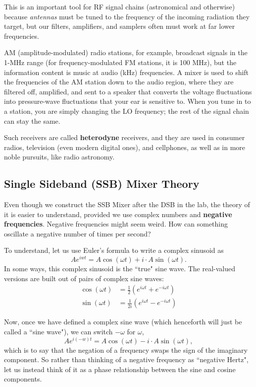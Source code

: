 \documentclass[11pt,preprint]{aastex}
\begin{document}
This is an important tool for RF signal chains (astronomical and otherwise)
because {\it antennas} must be tuned to the frequency of the incoming radiation they
target, but our filters, amplifiers, and samplers often must work at far lower
frequencies.

AM (amplitude-modulated) radio stations, for example, broadcast signals in the 1-MHz
range (for frequency-modulated FM stations, it is 100 MHz), but the information content
is music at audio (kHz) frequencies.
A mixer is used to shift the frequencies of
the AM station down to the audio region, where they are filtered off, amplified, and
sent to a speaker that converts the voltage fluctuations into pressure-wave fluctuations
that your ear is sensitive to.  When you tune in to a station, you are simply changing
the LO frequency; the rest of the signal chain can stay the same.

Such receivers are called {\bf heterodyne} receivers, and they are used 
in consumer radios, television (even modern digital ones), and cellphones, as well
as in more noble pursuits, like radio astronomy.
%
\subsection{Single Sideband (SSB) Mixer Theory}

\noindent
Even though we construct the SSB Mixer after the DSB in the lab, the theory of it
is easier to understand, provided we use
complex numbers and {\bf negative frequencies}.
Negative frequencies might seem weird. How can something oscillate
a negative number of times per second?

To understand, let us use
Euler's formula to write a complex sinusoid as
\begin{equation}
Ae^{iwt} = A\cos(\omega t) + i\cdot A\sin(\omega t).
\end{equation}
In some ways, this complex sinusoid is the ``true" sine wave.  The real-valued
versions are built out of pairs of complex sine waves:
\begin{align}
\cos(\omega t) &= \frac12(e^{i\omega t} + e^{-i\omega t}) \\
\sin(\omega t) &= \frac1{2i}(e^{i\omega t} - e^{-i\omega t})
\end{align}

Now, once we have defined a complex sine wave (which henceforth will just be
called a ``sine wave"), we can switch $-\omega$
for $\omega$,
\begin{equation}
Ae^{i(-w)t} = A\cos(\omega t) - i\cdot A\sin(\omega t),
\end{equation}
which is to say that the negation of a frequency swaps the sign of the imaginary 
component.  So rather than thinking of a negative frequency as ``negative Hertz",
let us instead think of it as a phase relationship between the sine and cosine components.
\end{document}
